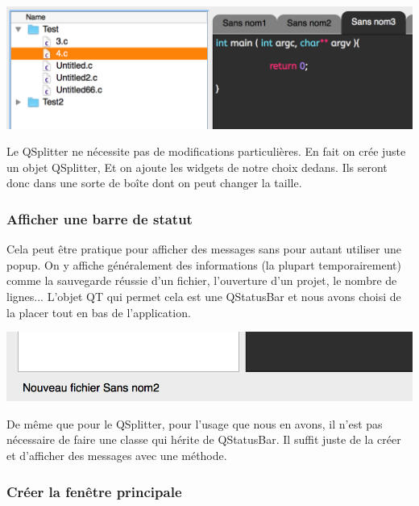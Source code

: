 \documentclass[a4paper,12pt]{article}
\begin{document}
			\begin{center}
				\includegraphics[scale=0.6]{images/QSplitter_2}
				\vspace{0.6cm}
			\end{center}
			Le QSplitter ne nécessite pas de modifications particulières. En fait on crée juste un objet QSplitter, Et on ajoute les widgets de notre choix dedans. Ils seront donc dans une sorte de boîte dont on peut changer la taille.\\
			
			\subsubsection*{Afficher une barre de statut}
			
			 	Cela peut être pratique pour afficher des messages sans pour autant utiliser une popup. On y affiche généralement des informations (la plupart temporairement) comme la sauvegarde réussie d'un fichier, l'ouverture d'un projet, le nombre de lignes... L'objet QT qui permet cela est une QStatusBar et nous avons choisi de la placer tout en bas de l'application.\\
			\begin{center}
				\includegraphics[scale=0.6]{images/QStatusBar}
				\vspace{0.6cm}
			\end{center}
			De même que pour le QSplitter, pour l'usage que nous en avons, il n'est pas nécessaire de faire une classe qui hérite de QStatusBar. Il suffit juste de la créer et d'afficher des messages avec une méthode.\\
			
			\subsubsection*{Créer la fenêtre principale}
			
\end{document}
